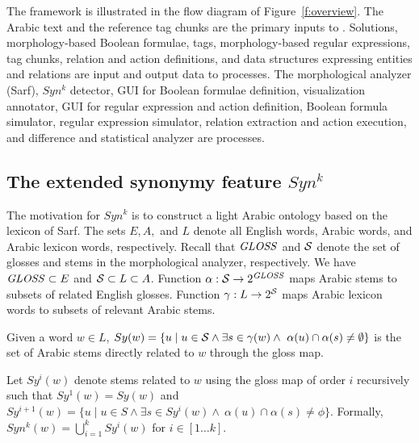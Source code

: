 

The \framework framework is illustrated in the flow diagram of
Figure~\ref{f:overview}.
The Arabic text and the reference tag chunks are the primary inputs to \framework. 
Solutions, morphology-based Boolean formulae, tags, 
morphology-based regular expressions, 
tag chunks, relation and action definitions, and data structures expressing entities 
and relations are input and output data to processes. 
The morphological analyzer (Sarf), $Syn^k$ detector, 
GUI for Boolean formulae definition, 
visualization annotator, GUI for regular expression and action definition, 
Boolean formula simulator, regular expression simulator, 
relation extraction and action execution, and difference and statistical analyzer 
are processes.


\subsection{The extended synonymy feature $Syn^k$}

The motivation for $Syn^k$ is to construct a light Arabic ontology based on the lexicon of Sarf.
The sets $E, A,$ and $L$ denote all English words, Arabic words, 
and Arabic lexicon words, respectively.
Recall that $\mathit{GLOSS}$ and $\ss$ denote the set of glosses and stems in the morphological analyzer, respectively.
We have $\mathit{GLOSS} \subset E$ and $\ss \subset L \subset A$. 
Function $\alpha: \ss \rightarrow 2^{\GG}$ maps Arabic stems to 
subsets of related English glosses. %
Function $\gamma: L \rightarrow 2^{\ss}$ maps Arabic lexicon words to subsets 
of relevant Arabic stems. %

Given a word $w\in L$, 
$Sy(w)=\{u\mid u\in \ss \land\exists s\in \gamma(w)\land~\alpha(u)\cap\alpha(s)\neq\emptyset\}$
is the set of Arabic stems 
directly related to $w$ through the gloss map.

Let $Sy^{i}(w)$ denote stems related to $w$ using the gloss map of order $i$ recursively such that
$Sy^{1}(w) = Sy(w)$ and
$Sy^{i+1}(w)=\{u\mid u\in S\land\exists s\in Sy^{i}(w)\land~\alpha(u)\cap\alpha(s)\neq\phi\}$.
Formally, $Syn^k(w) = \bigcup\limits_{i=1}^{k} Sy^{i}(w)$ for $i\in[1 \ldots k]$.

